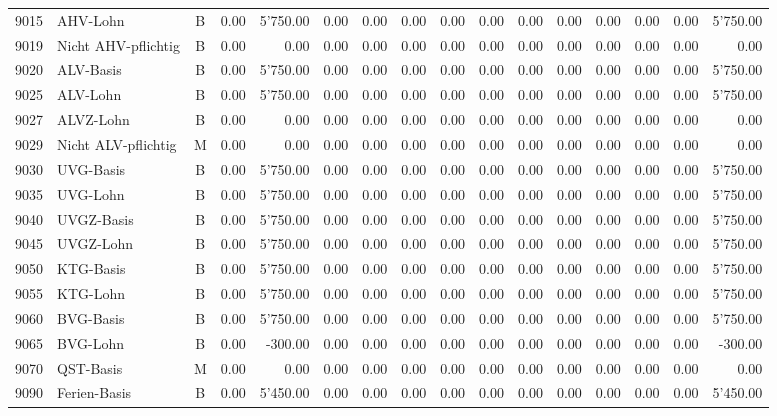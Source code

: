 \documentclass[8pt,a4paper]{extarticle}
\begin{document}
\begin{longtable}{@{\extracolsep{\fill}} l l c r r r r r r r r r r r r r}
9015&AHV-Lohn&B&0.00&5'750.00&0.00&0.00&0.00&0.00&0.00&0.00&0.00&0.00&0.00&0.00&5'750.00\\
9019&Nicht AHV-pflichtig&B&0.00&0.00&0.00&0.00&0.00&0.00&0.00&0.00&0.00&0.00&0.00&0.00&0.00\\
9020&ALV-Basis&B&0.00&5'750.00&0.00&0.00&0.00&0.00&0.00&0.00&0.00&0.00&0.00&0.00&5'750.00\\
9025&ALV-Lohn&B&0.00&5'750.00&0.00&0.00&0.00&0.00&0.00&0.00&0.00&0.00&0.00&0.00&5'750.00\\
9027&ALVZ-Lohn&B&0.00&0.00&0.00&0.00&0.00&0.00&0.00&0.00&0.00&0.00&0.00&0.00&0.00\\
9029&Nicht ALV-pflichtig&M&0.00&0.00&0.00&0.00&0.00&0.00&0.00&0.00&0.00&0.00&0.00&0.00&0.00\\
9030&UVG-Basis&B&0.00&5'750.00&0.00&0.00&0.00&0.00&0.00&0.00&0.00&0.00&0.00&0.00&5'750.00\\
9035&UVG-Lohn&B&0.00&5'750.00&0.00&0.00&0.00&0.00&0.00&0.00&0.00&0.00&0.00&0.00&5'750.00\\
9040&UVGZ-Basis&B&0.00&5'750.00&0.00&0.00&0.00&0.00&0.00&0.00&0.00&0.00&0.00&0.00&5'750.00\\
9045&UVGZ-Lohn&B&0.00&5'750.00&0.00&0.00&0.00&0.00&0.00&0.00&0.00&0.00&0.00&0.00&5'750.00\\
9050&KTG-Basis&B&0.00&5'750.00&0.00&0.00&0.00&0.00&0.00&0.00&0.00&0.00&0.00&0.00&5'750.00\\
9055&KTG-Lohn&B&0.00&5'750.00&0.00&0.00&0.00&0.00&0.00&0.00&0.00&0.00&0.00&0.00&5'750.00\\
9060&BVG-Basis&B&0.00&5'750.00&0.00&0.00&0.00&0.00&0.00&0.00&0.00&0.00&0.00&0.00&5'750.00\\
9065&BVG-Lohn&B&0.00&-300.00&0.00&0.00&0.00&0.00&0.00&0.00&0.00&0.00&0.00&0.00&-300.00\\
9070&QST-Basis&M&0.00&0.00&0.00&0.00&0.00&0.00&0.00&0.00&0.00&0.00&0.00&0.00&0.00\\
9090&Ferien-Basis&B&0.00&5'450.00&0.00&0.00&0.00&0.00&0.00&0.00&0.00&0.00&0.00&0.00&5'450.00\\

\end{longtable}
\pagebreak
\end{document}
